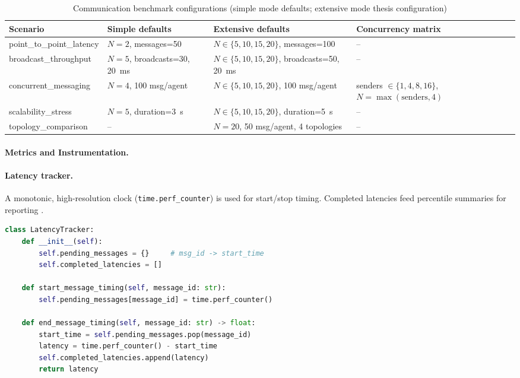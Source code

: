 \begin{table}[H]
\centering
\caption{Communication benchmark configurations (simple mode defaults; extensive mode thesis configuration)}
\label{tab:benchmark-configs}
\begin{tabular}{l|l|l|l}
\toprule
\textbf{Scenario} & \textbf{Simple defaults} & \textbf{Extensive defaults} & \textbf{Concurrency matrix} \\
\midrule
point\_to\_point\_latency & $N=2$, messages=50 & $N\in\{5,10,15,20\}$, messages=100 & -- \\
broadcast\_throughput & $N=5$, broadcasts=30, 20~ms & $N\in\{5,10,15,20\}$, broadcasts=50, 20~ms & -- \\
concurrent\_messaging & $N=4$, 100 msg/agent & $N\in\{5,10,15,20\}$, 100 msg/agent & senders $\in\{1,4,8,16\}$, $N=\max(\text{senders},4)$ \\
scalability\_stress & $N=5$, duration=3~s & $N\in\{5,10,15,20\}$, duration=5~s & -- \\
topology\_comparison & -- & $N=20$, 50 msg/agent, 4 topologies & -- \\
\bottomrule
\end{tabular}
\end{table}

\paragraph{Metrics and Instrumentation.}
\paragraph{Latency tracker.}
A monotonic, high-resolution clock (\texttt{time.perf\_counter}) is used for start/stop timing. Completed latencies feed percentile summaries for reporting \cite{PythonTime,DeanBarroso2013TailAtScale,Tene2015Latency}.

\begin{lstlisting}[language=Python, caption={Latency tracker}]
class LatencyTracker:
    def __init__(self):
        self.pending_messages = {}     # msg_id -> start_time
        self.completed_latencies = []

    def start_message_timing(self, message_id: str):
        self.pending_messages[message_id] = time.perf_counter()

    def end_message_timing(self, message_id: str) -> float:
        start_time = self.pending_messages.pop(message_id)
        latency = time.perf_counter() - start_time
        self.completed_latencies.append(latency)
        return latency
\end{lstlisting}


